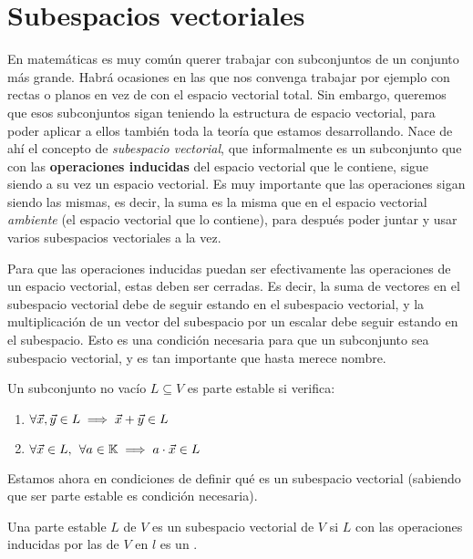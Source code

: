 \documentclass[../ecuaciones_diferenciales.tex]{subfiles}
\begin{document}
\section{Subespacios vectoriales}

En matemáticas es muy común querer trabajar con subconjuntos de un conjunto más grande. Habrá ocasiones en las que nos convenga trabajar por ejemplo con rectas o planos en vez de con el espacio vectorial total. Sin embargo, queremos que esos subconjuntos sigan teniendo la estructura de espacio vectorial, para poder aplicar a ellos también toda la teoría que estamos desarrollando. Nace de ahí el concepto de \textit{subespacio vectorial}, que informalmente es un subconjunto que con las \textbf{operaciones inducidas} del espacio vectorial que le contiene, sigue siendo a su vez un espacio vectorial. Es muy importante que las operaciones sigan siendo las mismas, es decir, la suma es la misma que en el espacio vectorial \textit{ambiente} (el espacio vectorial que lo contiene), para después poder juntar y usar varios subespacios vectoriales a la vez.

Para que las operaciones inducidas puedan ser efectivamente las operaciones de un espacio vectorial, estas deben ser cerradas. Es decir, la suma de vectores en el subespacio vectorial debe de seguir estando en el subespacio vectorial, y la multiplicación de un vector del subespacio por un escalar debe seguir estando en el subespacio. Esto es una condición necesaria para que un subconjunto sea subespacio vectorial, y es tan importante que hasta merece nombre.

\begin{definition}
    Un subconjunto no vacío $L\subseteq V$ es parte estable si verifica:
    \begin{enumerate}
        \item $\forall \vec{x}, \vec{y} \in L \implies \vec{x} + \vec{y} \in L$
        \item $\forall \vec{x} \in L, \hspace{1.5mm} \forall a \in \mathbb{K} \implies a\cdot \vec{x} \in L$
    \end{enumerate}
\end{definition}

Estamos ahora en condiciones de definir qué es un subespacio vectorial (sabiendo que ser parte estable es condición necesaria).

\begin{definition}
    Una parte estable $L$ de $V$ es un subespacio vectorial de $V$ si $L$ con las operaciones inducidas por las de $V$ en $l$ es un \kvspace.
\end{definition}
\end{document}
